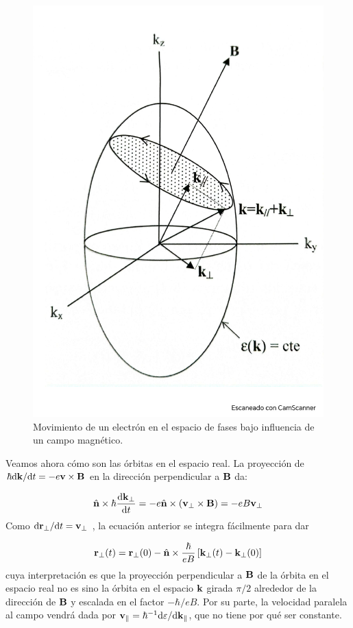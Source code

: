 \begin{figure}[h!] \centering
	\includegraphics[scale=0.35]{Cuerpo/Ch_08/Fotos libro 3.pdf}
	\caption{Movimiento de un electrón en el espacio de fases bajo influencia de un campo magnético.}
	\label{Fig:08-03}
\end{figure}

Veamos ahora cómo son las órbitas en el espacio real. La proyección de $\hbar \mathrm{d} \mathbf{k} / \mathrm{d} t = - e \mathbf{v} \times \mathbf{B}$ en la dirección perpendicular a $\mathbf{B}$ da:

\begin{equation}
	\hat{\mathbf{n}} \times \hbar \frac{\mathrm{d} \mathbf{k}_\perp}{\mathrm{d} t} = - e \hat{\mathbf{n}} \times (\mathbf{v}_\perp \times \mathbf{B}) = - e B \mathbf{v}_\perp
\end{equation}
Como $\mathrm{d} \mathbf{r}_\perp / \mathrm{d} t = \mathbf{v}_\perp$ , la ecuación anterior se integra fácilmente para dar 

\begin{equation}
	\mathbf{r}_\perp (t) = \mathbf{r}_\perp (0) - \hat{\mathbf{n}} \times \frac{\hbar}{eB} \left[  \mathbf{k}_\perp (t) - \mathbf{k}_\perp (0) \right]
\end{equation}
cuya interpretación es que la proyección perpendicular a $\mathbf{B}$ de la órbita en el espacio real no es sino la órbita en el espacio $\mathbf{k}$ girada $\pi/2$ alrededor de la dirección de $\mathbf{B}$ y escalada en el factor $-\hbar / eB$. Por su parte, la velocidad paralela al campo vendrá dada por $\mathbf{v}_\parallel=\hbar^{-1} \mathrm{d} \varepsilon/\mathrm{d} \mathbf{k}_\parallel$, que no tiene por qué ser constante. 

